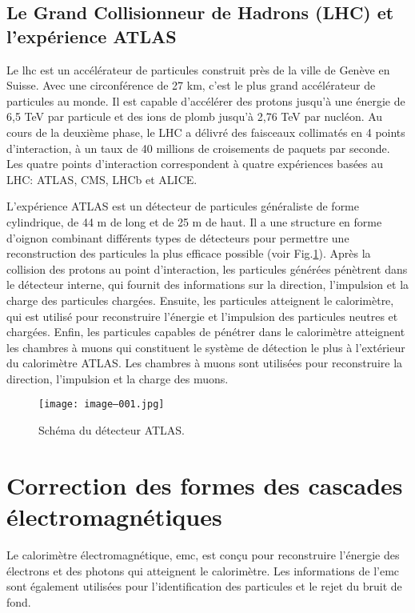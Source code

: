 \subsection*{Le Grand Collisionneur de Hadrons (LHC) et l’expérience ATLAS}

Le \gls{lhc} est un accélérateur de particules construit près de la ville de Genève en Suisse. Avec une circonférence de 27 km, c'est le plus grand accélérateur de particules au monde. Il est capable d'accélérer des protons jusqu'à une énergie de 6,5 TeV par particule et des ions de plomb jusqu'à 2,76 TeV par nucléon. Au cours de la deuxième phase, le LHC a délivré des faisceaux collimatés en 4 points d'interaction, à un taux de 40 millions de croisements de paquets par seconde. Les quatre points d'interaction correspondent à quatre expériences basées au LHC: ATLAS, CMS, LHCb et ALICE.

L'expérience ATLAS est un détecteur de particules généraliste de forme cylindrique, de 44 m de long et de 25 m de haut. Il a une structure en forme d'oignon combinant différents types de détecteurs pour permettre une reconstruction des particules la plus efficace possible (voir Fig.\ref{fig::atlas_layout_s}). Après la collision des protons au point d'interaction, les particules générées pénètrent dans le détecteur interne, qui fournit des informations sur la direction, l'impulsion et la charge des particules chargées. Ensuite, les particules atteignent le calorimètre, qui est utilisé pour reconstruire l'énergie et l'impulsion des particules neutres et chargées. Enfin, les particules capables de pénétrer dans le calorimètre atteignent les chambres à muons qui constituent le système de détection le plus à l'extérieur du calorimètre ATLAS. Les chambres à muons sont utilisées pour reconstruire la direction, l'impulsion et la charge des muons.
\begin{figure}[htpb]
	\centering
	\texttt{[image: image--001.jpg]}
	\caption{ Schéma du détecteur ATLAS.}
	\label{fig::atlas_layout_s}
\end{figure}

\section*{Correction des formes des cascades électromagnétiques}
Le calorimètre électromagnétique, \gls{emc}, est conçu pour reconstruire l'énergie des électrons et des photons qui atteignent le calorimètre. Les informations de l'\gls{emc} sont également utilisées pour l'identification des particules et le rejet du bruit de fond.

